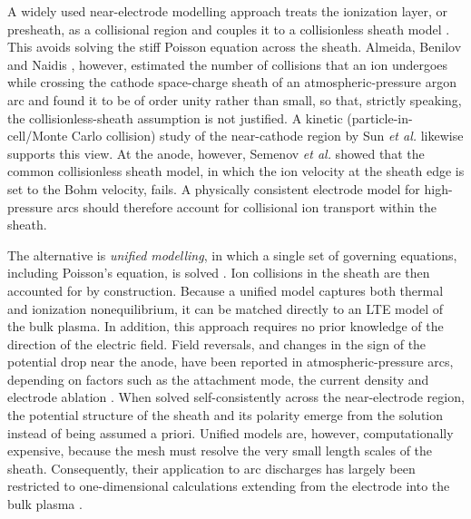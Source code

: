 A widely used near-electrode modelling approach treats the ionization layer, or presheath, as a collisional region and couples it to a collisionless sheath model \cite{DinulescuPfender1980,hsu1983analysis,schmitz2002analysis,benilov1995model}. This avoids solving the stiff Poisson equation across the sheath. Almeida, Benilov and Naidis \cite{Almeida2008}, however, estimated the number of collisions that an ion undergoes while crossing the cathode space-charge sheath of an atmospheric-pressure argon arc and found it to be of order unity rather than small, so that, strictly speaking, the collisionless-sheath assumption is not justified. A kinetic (particle-in-cell/Monte Carlo collision) study of the near-cathode region by Sun \textit{et al.} \cite{sun2022unified} likewise supports this view. At the anode, however, Semenov \textit{et al.} \cite{semenov2016numerical} showed that the common collisionless sheath model, in which the ion velocity at the sheath edge is set to the Bohm velocity, fails. A physically consistent electrode model for high-pressure arcs should therefore account for collisional ion transport within the sheath.

The alternative is \emph{unified modelling}, in which a single set of governing equations, including Poisson's equation, is solved  \cite{Almeida2008,semenov2016numerical,sun2022unified,sitaraman2026elucidating}. Ion collisions in the sheath are then accounted for by construction. Because a unified model captures both thermal and ionization nonequilibrium, it can be matched directly to an LTE model of the bulk plasma. In addition, this approach requires no prior knowledge of the direction of the electric field. Field reversals, and changes in the sign of the potential drop near the anode, have been reported in atmospheric-pressure arcs, depending on factors such as the attachment mode, the current density and electrode ablation \cite{SandersPfender1984,nemchinsky2016anode,heberlein2010anode,baeva2016novel}. When  solved self-consistently across the near-electrode region, the potential structure of the sheath and its polarity emerge from the solution instead of being assumed a priori. Unified models are, however, computationally expensive, because the mesh must resolve the very small length scales of the sheath. Consequently, their application to arc discharges has largely been restricted to one-dimensional calculations extending from the electrode into the bulk plasma \cite{Almeida2008,almeida2009investigating,krivtsun2025model,semenov2016numerical}.


